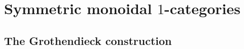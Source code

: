 \documentclass{MetricNotes2023}
\begin{document}

\section{Symmetric monoidal \(1\)-categories}

\subsection{The Grothendieck construction}
\end{document}
